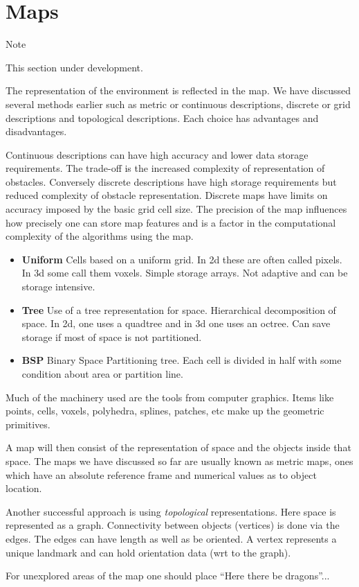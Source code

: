 \hypertarget{maps}{%
\section{Maps}\label{maps}}

Note

This section under development.

The representation of the environment is reflected in the map. We have
discussed several methods earlier such as metric or continuous
descriptions, discrete or grid descriptions and topological
descriptions. Each choice has advantages and disadvantages.

Continuous descriptions can have high accuracy and lower data storage
requirements. The trade-off is the increased complexity of
representation of obstacles. Conversely discrete descriptions have high
storage requirements but reduced complexity of obstacle representation.
Discrete maps have limits on accuracy imposed by the basic grid cell
size. The precision of the map influences how precisely one can store
map features and is a factor in the computational complexity of the
algorithms using the map.

\begin{itemize}
\tightlist
\item
  \textbf{Uniform} Cells based on a uniform grid. In 2d these are often
  called pixels. In 3d some call them voxels. Simple storage arrays. Not
  adaptive and can be storage intensive.
\item
  \textbf{Tree} Use of a tree representation for space. Hierarchical
  decomposition of space. In 2d, one uses a quadtree and in 3d one uses
  an octree. Can save storage if most of space is not partitioned.
\item
  \textbf{BSP} Binary Space Partitioning tree. Each cell is divided in
  half with some condition about area or partition line.
\end{itemize}

Much of the machinery used are the tools from computer graphics. Items
like points, cells, voxels, polyhedra, splines, patches, etc make up the
geometric primitives.

A map will then consist of the representation of space and the objects
inside that space. The maps we have discussed so far are usually known
as metric maps, ones which have an absolute reference frame and
numerical values as to object location.

Another successful approach is using \emph{topological} representations.
Here space is represented as a graph. Connectivity between objects
(vertices) is done via the edges. The edges can have length as well as
be oriented. A vertex represents a unique landmark and can hold
orientation data (wrt to the graph).

For unexplored areas of the map one should place ``Here there be
dragons''...
